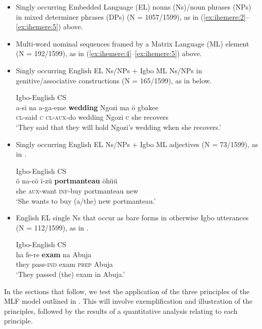 \documentclass[output=paper]{langsci/langscibook}
\begin{document}
\begin{itemize}
 \item Singly occurring Embedded Language (EL) nouns (Ns)/noun phrases (NPs) in mixed determiner phrases (DPs) (N = 1057/1599), as in (\ref{ex:ihemere:2}--\ref{ex:ihemere:5}) above. 

 \item Multi-word nominal sequences framed by a Matrix Language (ML) element (N = 192/1599), as in (\ref{ex:ihemere:4}--\ref{ex:ihemere:5}) above.

 \item Singly occurring English EL Ns/NPs + Igbo ML Ns/NPs in genitive/associative constructions (N = 165/1599), as in  below.
 
\ea\label{ex:ihemere:6}
{Igbo-English \textsc{CS}}\\
\gll a-si    na  a-ga-eme   \textbf{wedding}  Ngozi  ma   ö  gbakee\\
     \textsc{cl}-said  \textsc{c}  \textsc{cl-aux}-do  wedding  Ngozi  \textsc{c}  she  recovers\\
\glt ‘They said that they will hold Ngozi’s wedding when she recovers.’
\z

\item Singly occurring English EL Ns/NPs + Igbo ML adjectives (N = 73/1599), as in .
 

\ea\label{ex:ihemere:7}
{Igbo-English \textsc{CS}}\\
\gll ö  na-cö    ï-zü    \textbf{portmanteau}  öhüü \\
     she  \textsc{aux}-want  \textsc{inf}-buy  portmanteau  new\\
\glt ‘She wants to buy (a/the) new portmanteau.’
\z
\item English EL single Ns that occur as bare forms in otherwise Igbo utterances (N = 112/1599), as in .


\ea\label{ex:ihemere:8}
{Igbo-English \textsc{CS}}\\
\gll ha    fe-re    \textbf{exam}  na   Abuja\\
     they  pass-\textsc{ind}  exam  \textsc{prep}  Abuja \\
\glt ‘They passed (the) exam in Abuja.’
\z

\end{itemize}

In the sections that follow, we test the application of the three principles of the MLF model outlined in . This will involve exemplification and illustration of the principles, followed by the results of a quantitative analysis relating to each principle. 
\end{document}
